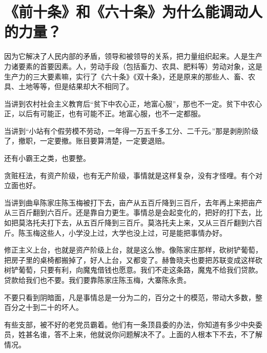\section[《前十条》和《六十条》为什么能调动人的力量？（一九六四年）]{《前十条》和《六十条》为什么能调动人的力量？}


因为它解决了人民内部的矛盾，领导和被领导的关系，把力量组织起来。人是生产力诸要素的首要因素。人，劳动手段（包括畜力、农具、肥料等）劳动对象，这是生产力的三大要素嘛，实行了《六十条》《双十条》，还是原来的那些人、畜、农具、土地等等，但是结果却大不相同了。

当讲到农村社会主义教育后“贫下中农心正，地富心服”，那也不一定。贫下中农心正，以后有可能正，也有可能不正。地富心服，也不一定都服。

当讲到“小站有个假劳模不劳动，一年得一万五千多工分、二千元。”那是剥削阶级了，撤职，一定要撤。账目要算清楚，一定要退赔。

还有小霸王之类，也要整。

贪赃枉法，有资产阶级，也有无产阶级，事情就是这样复杂，没有才怪哩。有个对立面也好。

当讲到曲阜陈家庄陈玉梅被打下去，亩产从五百斤降到三百斤，去年再上来把亩产从三百斤翻到六百斤。还是靠自力更生。事情总是会起变化的，把好的打下去，比如把莫洛托夫打下去，从五百斤降到三百斤。莫洛托夫上来，又从三百斤翻到六百斤。陈玉梅这些人，小学没上过，大学也没上过，可是能把事情办好。

修正主义上台，也就是资产阶级上台，就是这么惨。像陈家庄那样，砍树铲葡萄，把房子里的桌椅都搬掉了，好人上台，又都变了。赫鲁晓夫也要把苏联变成这样砍树铲葡萄，只要有利，向魔鬼借钱也愿意。我们不走这条路，魔鬼不给我们贷款。贷款给我们也不要。我们要靠陈家庄陈玉梅，大寨陈永贵。

不要只看到阴暗面，凡是事情总是一分为二的，百分之十的模范，带动大多数，整百分之十到二十的坏人。

有些支部，被不好的老党员霸着。他们有一条顶县委的办法，你知道有多少中央委员，姓甚名谁，答不上来，他就说你问题解决不了。上面的人根本下不去，不了解情况。

